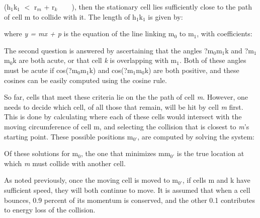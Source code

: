 \documentclass[12pt,a4paper]{report}
\begin{document}
\newpage




(h$_{1}$k$_{1}$ $<$ r$_{m}$ + r$_{k}$\ \ \ \ ), then the 
stationary cell lies sufficiently close to the path of cell m to collide 
with it. The length of h$_{1}$k$_{1}$ is given by:

\begin{figure}[H]
\centering
\end{figure}


where {\itshape y = mx + p }is the equation of the line linking m$_{0
}$ to m$_{1}$, with coefficients:

\begin{figure}[H]
\centering
\end{figure}




The second question is answered by ascertaining that the angles ?m$_{0
}$m$_{1}$k and ?m$_{1}$m$_{0}$k are both acute, or that 
cell {\itshape k} is overlapping with m$_{1}$. Both of these angles 
must be acute if cos(?m$_{0}$m$_{1}$k) and cos(?m$_{1}$m$_{
0}$k) are both positive, and these cosines can be easily computed 
using the cosine rule.



So far, cells that meet these criteria lie on the the path of cell 
{\itshape m}. However, one needs to decide which cell, of all those 
that remain, will be hit by cell {\itshape m} first. This is done by 
calculating where each of these cells would intersect with the moving 
circumference of cell m, and selecting the collision that is closest to 
{\itshape m}'s starting point. These possible positions m$_{0'}$, 
are computed by solving the system:

\begin{figure}[H]
\centering
\end{figure}


Of these solutions for m$_{0}$, the one that minimizes mm$_{0'}$ 
is the true location at which {\itshape m} must collide with another 
cell. 



As noted previously, once the moving cell is moved to m$_{0'}$, if 
cells m and k have sufficient speed, they will both continue to move. It 
is assumed that when a cell bounces, 0.9 percent of its momentum is 
conserved, and the other 0.1 contributes to energy loss of the 
collision. 
\end{document}
